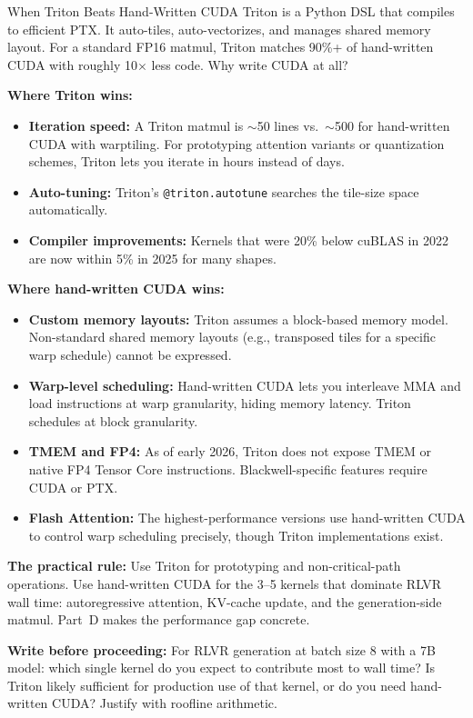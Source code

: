 \begin{thinkfirst}{When Triton Beats Hand-Written CUDA}
Triton is a Python DSL that compiles to efficient PTX. It auto-tiles, auto-vectorizes, and manages shared memory layout. For a standard FP16 matmul, Triton matches 90\%+ of hand-written CUDA with roughly 10$\times$ less code. Why write CUDA at all?

\textbf{Where Triton wins:}
\begin{itemize}
  \item \textbf{Iteration speed:} A Triton matmul is $\sim$50 lines vs.\ $\sim$500 for hand-written CUDA with warptiling. For prototyping attention variants or quantization schemes, Triton lets you iterate in hours instead of days.
  \item \textbf{Auto-tuning:} Triton's \texttt{@triton.autotune} searches the tile-size space automatically.
  \item \textbf{Compiler improvements:} Kernels that were 20\% below cuBLAS in 2022 are now within 5\% in 2025 for many shapes.
\end{itemize}

\textbf{Where hand-written CUDA wins:}
\begin{itemize}
  \item \textbf{Custom memory layouts:} Triton assumes a block-based memory model. Non-standard shared memory layouts (e.g., transposed tiles for a specific warp schedule) cannot be expressed.
  \item \textbf{Warp-level scheduling:} Hand-written CUDA lets you interleave MMA and load instructions at warp granularity, hiding memory latency. Triton schedules at block granularity.
  \item \textbf{TMEM and FP4:} As of early 2026, Triton does not expose TMEM or native FP4 Tensor Core instructions. Blackwell-specific features require CUDA or PTX.
  \item \textbf{Flash Attention:} The highest-performance versions use hand-written CUDA to control warp scheduling precisely, though Triton implementations exist.
\end{itemize}

\textbf{The practical rule:} Use Triton for prototyping and non-critical-path operations. Use hand-written CUDA for the 3--5 kernels that dominate RLVR wall time: autoregressive attention, KV-cache update, and the generation-side matmul. Part~D makes the performance gap concrete.

\textbf{Write before proceeding:} For RLVR generation at batch size 8 with a 7B model: which single kernel do you expect to contribute most to wall time? Is Triton likely sufficient for production use of that kernel, or do you need hand-written CUDA? Justify with roofline arithmetic.
\end{thinkfirst}

